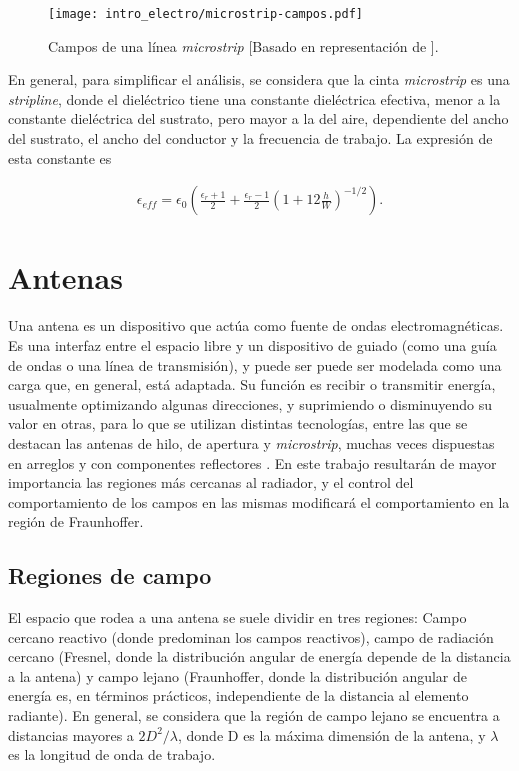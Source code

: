 \begin{figure}[htp]
	\centering
	\texttt{[image: intro\_electro/microstrip-campos.pdf]}
	\caption{Campos de una línea \textit{microstrip} [Basado en representación de \cite{Pozar:MwEngineering}].}
	\label{fig:microstrip-campos}
\end{figure}

En general, para simplificar el análisis, se considera que la cinta \textit{microstrip} es una \textit{stripline}, donde el dieléctrico tiene una constante dieléctrica efectiva, menor a la constante dieléctrica del sustrato, pero mayor a la del aire, dependiente del ancho del sustrato, el ancho del conductor y la frecuencia de trabajo. La expresión de esta constante es

\begin{align}
	\epsilon_{eff} = \epsilon_0 \left(\frac{\epsilon_r+1}{2} + \frac{\epsilon_r-1}{2} \left( 1+12 \frac{h}{W} \right)^{-1/2} \right).
	\label{eq:cte-diel-efectiva-microstrip}
\end{align}

\section{Antenas}
\label{subsec_antenas}

Una antena es un dispositivo que actúa como fuente de ondas electromagnéticas. Es una interfaz entre el espacio libre y un dispositivo de guiado (como una guía de ondas o una línea de transmisión), y puede ser puede ser modelada como una carga que, en general, está adaptada. Su función es recibir o transmitir energía, usualmente optimizando algunas direcciones, y suprimiendo o disminuyendo su valor en otras, para lo que se utilizan distintas tecnologías, entre las que se destacan las antenas de hilo, de apertura y \textit{microstrip}, muchas veces dispuestas en arreglos y con componentes reflectores \cite{Balanis:Theory}. En este trabajo resultarán de mayor importancia las regiones más cercanas al radiador, y el control del comportamiento de los campos en las mismas modificará el comportamiento en la región de Fraunhoffer.

\subsection{Regiones de campo}
\label{subsubsec_regiones_de_campo}
El espacio que rodea a una antena se suele dividir en tres regiones: Campo cercano reactivo (donde predominan los campos reactivos), campo de radiación cercano (Fresnel, donde la distribución angular de energía depende de la distancia a la antena) y campo lejano (Fraunhoffer, donde la distribución angular de energía es, en términos prácticos, independiente de la distancia al elemento radiante). En general, se considera que la región de campo lejano se encuentra a distancias mayores a $2D^2/\lambda$, donde D es la máxima dimensión de la antena, y $\lambda$ es la longitud de onda de trabajo.

